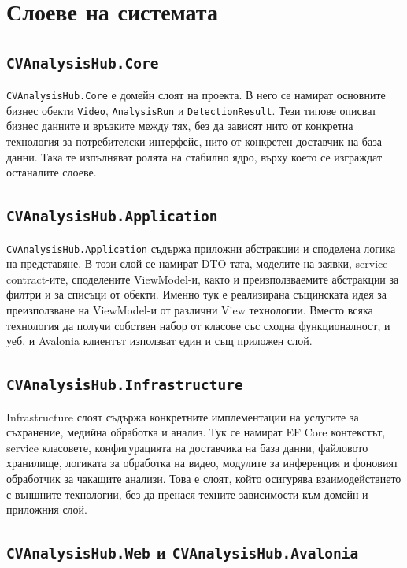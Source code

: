 \section{Слоеве на системата}

\subsection{\texttt{CVAnalysisHub.Core}}

\texttt{CVAnalysisHub.Core} е домейн слоят на проекта. В него се намират основните бизнес обекти \texttt{Video}, \texttt{AnalysisRun} и \texttt{DetectionResult}. Тези типове описват бизнес данните и връзките между тях, без да зависят нито от конкретна технология за потребителски интерфейс, нито от конкретен доставчик на база данни. Така те изпълняват ролята на стабилно ядро, върху което се изграждат останалите слоеве.

\subsection{\texttt{CVAnalysisHub.Application}}

\texttt{CVAnalysisHub.Application} съдържа приложни абстракции и споделена логика на представяне. В този слой се намират DTO-тата, моделите на заявки, service contract-ите, споделените ViewModel-и, както и преизползваемите абстракции за филтри и за списъци от обекти. Именно тук е реализирана същинската идея за преизползване на ViewModel-и от различни View технологии. Вместо всяка технология да получи собствен набор от класове със сходна функционалност, и уеб, и Avalonia клиентът използват един и същ приложен слой.

\subsection{\texttt{CVAnalysisHub.Infrastructure}}

Infrastructure слоят съдържа конкретните имплементации на услугите за съхранение, медийна обработка и анализ. Тук се намират EF Core контекстът, service класовете, конфигурацията на доставчика на база данни, файловото хранилище, логиката за обработка на видео, модулите за инференция и фоновият обработчик за чакащите анализи. Това е слоят, който осигурява взаимодействието с външните технологии, без да пренася техните зависимости към домейн и приложния слой.

\subsection{\texttt{CVAnalysisHub.Web} и \texttt{CVAnalysisHub.Avalonia}}

